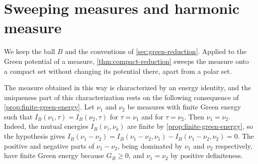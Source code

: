 \section{Sweeping measures and harmonic measure}
\label{sec:balayage-measures}
We keep the ball $B$ and the conventions of \cref{sec:green-reduction}. Applied to the Green potential of a measure, \cref{thm:compact-reduction} sweeps the measure onto a compact set without changing its potential there, apart from a polar set.

The measure obtained in this way is characterized by an energy identity, and the uniqueness part of this characterization rests on the following consequence of \cref{prop:finite-green-energy}. Let $\nu_1$ and $\nu_2$ be measures with finite Green energy such that $I_B(\nu_1,\tau)=I_B(\nu_2,\tau)$ for $\tau=\nu_1$ and for $\tau=\nu_2$. Then $\nu_1=\nu_2$. Indeed, the mutual energies $I_B(\nu_i,\nu_k)$ are finite by \cref{prop:finite-green-energy}, so the hypothesis gives $I_B(\nu_1-\nu_2)=I_B(\nu_1-\nu_2,\nu_1)-I_B(\nu_1-\nu_2,\nu_2)=0$. The positive and negative parts of $\nu_1-\nu_2$, being dominated by $\nu_1$ and $\nu_2$ respectively, have finite Green energy because $G_B\geq0$, and $\nu_1=\nu_2$ by positive definiteness.

